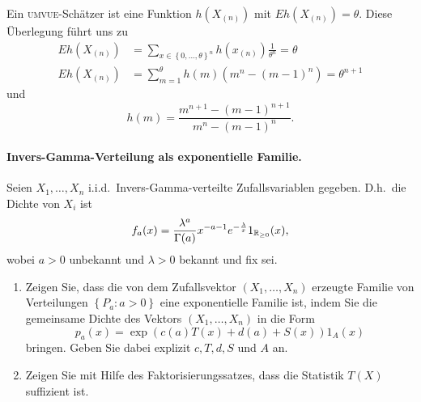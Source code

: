 Ein \textsc{umvue}-Schätzer ist eine Funktion $h(X_{(n)})$ mit $E h(X_{(n)})=\theta$.
Diese Überlegung führt uns zu
\begin{align*}
    E h(X_{(n)}) &= 
    \sum_{x\in \left\{ 0,\ldots,\theta \right\}^n } h(x_{(n)}) \frac{1}{\theta^n} = \theta \\
    E h(X_{(n)}) &= \sum_{m=1}^{\theta} h(m)(m^n - (m-1)^n) = \theta^{n+1}
\end{align*}
und
\begin{equation*}
    h(m) = \frac{m^{n+1} - (m-1)^{n+1}}{m^n - (m-1)^{n}}.
\end{equation*}



\paragraph{Invers-Gamma-Verteilung als exponentielle Familie.}
Seien $X_1,\ldots,X_n$ i.i.d.\ Invers-Gamma-verteilte Zufallsvariablen gegeben.
D.h.\ die Dichte von $X_i$ ist 
\begin{equation*}
    f_{a}(x) = \frac{\lambda^a}{\Gamma(a)}x^{-a-1} e^{-\frac{\lambda}{x}}1_{\mathbb R_{\geq 0}}(x),
\end{equation*}
wobei $a>0$ unbekannt und $\lambda>0$ bekannt und fix sei.
\begin{enumerate}
    \item Zeigen Sie, dass die von dem Zufallsvektor $( X_1,\ldots,X_n)$
        erzeugte Familie von Verteilungen $\left\{ P_a : a>0 \right\}$ eine
        exponentielle Familie ist, indem Sie die gemeinsame Dichte des Vektors
        $(X_1,\ldots,X_n)$ in die Form
        \begin{equation*}
            p_a(x) = \exp\left( c(a) T(x) + d(a) + S(x) \right)1_A (x)
        \end{equation*}
        bringen. Geben Sie dabei explizit $c,T,d,S$ und $A$ an.
    \item Zeigen Sie mit Hilfe des Faktorisierungssatzes, dass die Statistik
        $T(X)$ suffizient ist.
\end{enumerate}

